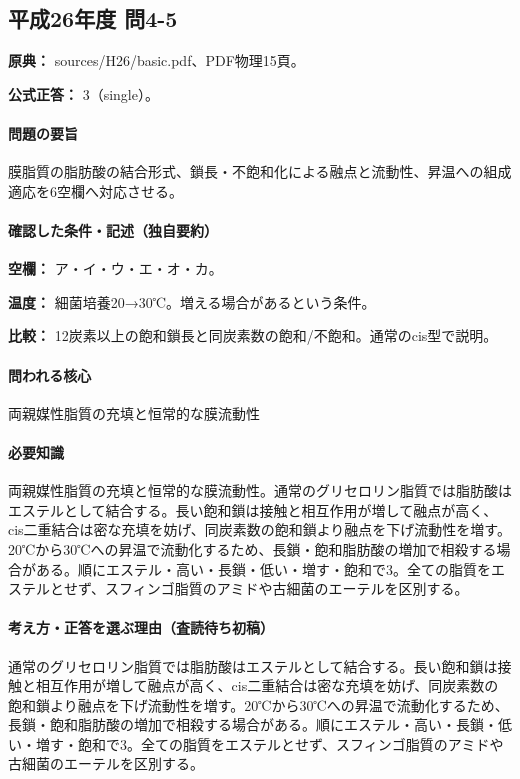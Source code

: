 \subsection{平成26年度 問4-5}
\label{q:h26-reg-basic-4-5}

\noindent\textbf{原典：} sources/H26/basic.pdf、PDF物理15頁。

\textbf{公式正答：} 3（single）。

\paragraph{問題の要旨} 膜脂質の脂肪酸の結合形式、鎖長・不飽和化による融点と流動性、昇温への組成適応を6空欄へ対応させる。

\paragraph{確認した条件・記述（独自要約）}\mbox{}\par

\noindent\textbf{空欄：} ア・イ・ウ・エ・オ・カ。\par

\noindent\textbf{温度：} 細菌培養20→30℃。増える場合があるという条件。\par

\noindent\textbf{比較：} 12炭素以上の飽和鎖長と同炭素数の飽和/不飽和。通常のcis型で説明。\par

\paragraph{問われる核心} 両親媒性脂質の充填と恒常的な膜流動性

\paragraph{必要知識} 両親媒性脂質の充填と恒常的な膜流動性。通常のグリセロリン脂質では脂肪酸はエステルとして結合する。長い飽和鎖は接触と相互作用が増して融点が高く、cis二重結合は密な充填を妨げ、同炭素数の飽和鎖より融点を下げ流動性を増す。20℃から30℃への昇温で流動化するため、長鎖・飽和脂肪酸の増加で相殺する場合がある。順にエステル・高い・長鎖・低い・増す・飽和で3。全ての脂質をエステルとせず、スフィンゴ脂質のアミドや古細菌のエーテルを区別する。

\paragraph{考え方・正答を選ぶ理由（査読待ち初稿）} 通常のグリセロリン脂質では脂肪酸はエステルとして結合する。長い飽和鎖は接触と相互作用が増して融点が高く、cis二重結合は密な充填を妨げ、同炭素数の飽和鎖より融点を下げ流動性を増す。20℃から30℃への昇温で流動化するため、長鎖・飽和脂肪酸の増加で相殺する場合がある。順にエステル・高い・長鎖・低い・増す・飽和で3。全ての脂質をエステルとせず、スフィンゴ脂質のアミドや古細菌のエーテルを区別する。

